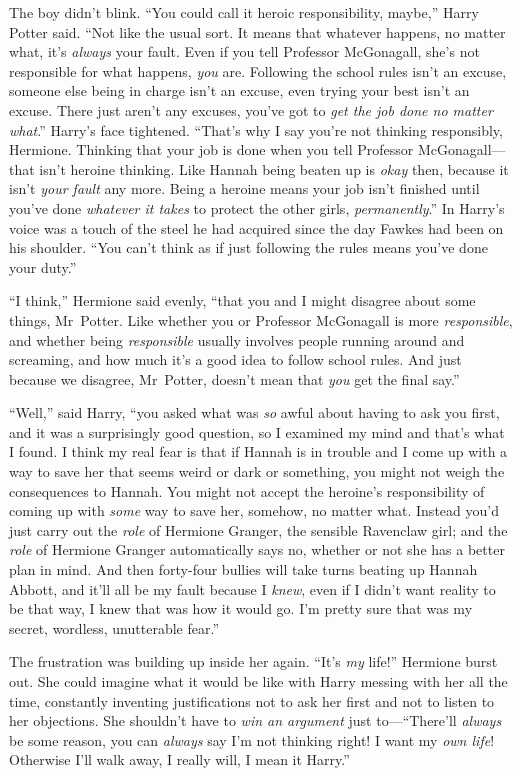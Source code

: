 The boy didn’t blink.
“You could call it heroic responsibility, maybe,” Harry Potter said.
“Not like the usual sort. It means that whatever happens, no matter what, it’s \emph{always} your fault. Even if you tell Professor McGonagall, she’s not responsible for what happens, \emph{you} are. Following the school rules isn’t an excuse, someone else being in charge isn’t an excuse, even trying your best isn’t an excuse. There just aren’t any excuses, you’ve got to \emph{get the job done no matter what}.” Harry’s face tightened.
“That’s why I say you’re not thinking responsibly, Hermione. Thinking that your job is done when you tell Professor McGonagall—that isn’t heroine thinking. Like Hannah being beaten up is \emph{okay} then, because it isn’t \emph{your fault} any more. Being a heroine means your job isn’t finished until you’ve done \emph{whatever it takes} to protect the other girls, \emph{permanently}.” In Harry’s voice was a touch of the steel he had acquired since the day Fawkes had been on his shoulder.
“You can’t think as if just following the rules means you’ve done your duty.”

“I think,” Hermione said evenly, “that you and I might disagree about some things, Mr~Potter. Like whether you or Professor McGonagall is more \emph{responsible}, and whether being \emph{responsible} usually involves people running around and screaming, and how much it’s a good idea to follow school rules. And just because we disagree, Mr~Potter, doesn’t mean that \emph{you} get the final say.”

“Well,” said Harry, “you asked what was \emph{so} awful about having to ask you first, and it was a surprisingly good question, so I examined my mind and that’s what I found. I think my real fear is that if Hannah is in trouble and I come up with a way to save her that seems weird or dark or something, you might not weigh the consequences to Hannah. You might not accept the heroine’s responsibility of coming up with \emph{some} way to save her, somehow, no matter what. Instead you’d just carry out the \emph{role} of Hermione Granger, the sensible Ravenclaw girl; and the \emph{role} of Hermione Granger automatically says no, whether or not she has a better plan in mind. And then forty-four bullies will take turns beating up Hannah Abbott, and it’ll all be my fault because I \emph{knew}, even if I didn’t want reality to be that way, I knew that was how it would go. I’m pretty sure that was my secret, wordless, unutterable fear.”

The frustration was building up inside her again.
“It’s \emph{my} life!” Hermione burst out. She could imagine what it would be like with Harry messing with her all the time, constantly inventing justifications not to ask her first and not to listen to her objections. She shouldn’t have to \emph{win an argument} just to—“There’ll \emph{always} be some reason, you can \emph{always} say I’m not thinking right! I want my \emph{own life}! Otherwise I’ll walk away, I really will, I mean it Harry.”

